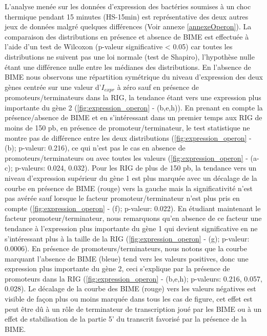 \documentclass[12pt,a4paper]{report}
\begin{document}
\begin{onehalfspace}
L'analyse menée sur les données d'expression des bactéries soumises à un choc thermique pendant 15 minutes (HS-15min) est représentative des deux autres jeux de données malgré quelques différences (Voir annexe \ref{annexeOperon}). La comparaison des distributions en présence et absence de BIME est effectuée à l'aide d'un test de Wilcoxon (p-valeur significative < 0.05) car toutes les distributions ne suivent pas une loi normale (test de Shapiro), l'hypothèse nulle étant une différence nulle entre les médianes des distributions. En l'absence de BIME nous observons une répartition symétrique du niveau d'expression des deux gènes centrée sur une valeur d'$I_{expr}$ à zéro sauf en présence de promoteurs/terminateurs dans la RIG, la tendance étant vers une expression plus importante du gène 2 (\autoref{fig:expression_operon} - (b,e,h)).
En prenant en compte la présence/absence de BIME et en s'intéressant dans un premier temps aux RIG de moins de 150 pb, en présence de promoteur/terminateur, le test statistique ne montre pas de différence entre les deux distributions (\autoref{fig:expression_operon} - (b); p-valeur: 0.216), ce qui n'est pas le cas en absence de promoteurs/terminateurs ou avec toutes les valeurs (\autoref{fig:expression_operon} - (a-c); p-valeurs: 0.024, 0.032). 
Pour les RIG de plus de 150 pb, la tendance vers un niveau d'expression supérieur du gène 1 est plus marquée avec un décalage de la courbe en présence de BIME (rouge) vers la gauche mais la significativité n'est pas avérée sauf lorsque le facteur promoteur/terminateur n'est plus pris en compte  (\autoref{fig:expression_operon} - (f); p-valeur: 0.022). 
En étudiant maintenant le facteur promoteur/terminateur, nous remarquons qu'en absence de ce facteur une tendance à l'expression plus importante du gène 1 qui devient significative en ne s'intéressant plus à la taille de la RIG (\autoref{fig:expression_operon} - (g); p-valeur: 0.0006). En présence de promoteurs/terminateurs, nous notons que la courbe marquant l'absence de BIME (bleue) tend vers les valeurs positives, donc une expression plus importante du gène 2, ceci s'explique par la présence de promoteurs dans la RIG (\autoref{fig:expression_operon} - (b,e,h); p-valeurs: 0.216, 0.057, 0.028). Le décalage de la courbe des BIME (rouge) vers les valeurs négatives est visible de façon plus ou moins marquée dans tous les cas de figure, cet effet est peut être dû à un rôle de terminateur de transcription joué par les BIME ou à un effet de stabilisation de la partie 5' du transcrit favorisé par la présence de la BIME.


\end{onehalfspace}
\end{document}
